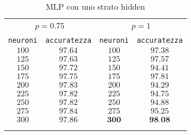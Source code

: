 \vspace*{\fill}
\begin{center}

\begin{table}[]
  \small
  \caption{MLP con uno strato hidden}\label{tab:modselmnist}
\begin{center}
\begin{tabular}{@{}cc|cc@{}}

\hline\\[-11pt]
\hline\\[-6.5pt]
\multicolumn{2}{c}{\bf $p=0.75$} & \multicolumn{2}{c}{\bf $p=1$ } \\[5pt]
\hline\\[-11pt]
\texttt{neuroni} & \texttt{accuratezza} & \texttt{neuroni} & \texttt{accuratezza} \\[1pt]
$100$ & $97.64$ & $100$ & $97.38$ \\ [1pt]
$125$ & $97.63$ & $125$ & $97.57$ \\ [1pt]
$150$ & $97.72$ & $150$ & $94.41$ \\ [1pt]
$175$ & $97.75$ & $175$ & $97.81$ \\ [1pt]
$200$ & $97.83$ & $200$ & $94.29$ \\ [1pt]
$225$ & $97.82$ & $225$ & $94.75$ \\ [1pt]
$250$ & $97.82$ & $250$ & $94.88$ \\ [1pt]
$275$ & $97.84$ & $275$ & $95.25$ \\ [1pt]
$300$ & $97.86$ & $\textbf{300}$ & $\textbf{98.08}$ \\ [1pt]
\hline\\[-11pt]
\hline\\[-8pt]
\end{tabular}\\[5pt]
\end{center}
\normalsize
\end{table}
\end{center}

